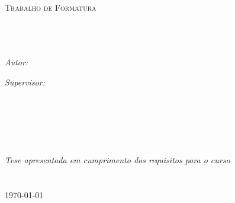 \documentclass[
11pt, %
brazilian, %
singlespacing, %
]{MastersDoctoralThesis} %
\author{Antonio R. de Campos Junior} %
\begin{document}
\frontmatter %

\pagestyle{plain} %


\begin{titlepage}
\begin{center}

\textsc{\LARGE \univname}\\[1.5cm] %
\textsc{\Large Trabalho de Formatura}\\[0.5cm] %

\HRule \\[0.4cm] %
{\huge \bfseries \ttitle}\\[0.4cm] %
\HRule \\[1.5cm] %
 
\begin{minipage}{0.4\textwidth}
\begin{flushleft} \large
\emph{Autor:}\\
\href{http://www.ime.usp.br/~arcjr}{\authorname} %
\end{flushleft}
\end{minipage}
\begin{minipage}{0.4\textwidth}
\begin{flushright} \large
\emph{Supervisor:} \\
\href{http://www.ime.usp.br/~cef/}{\supname} %
\end{flushright}
\end{minipage}\\[3cm]
\leavevmode \\
\leavevmode \\
\leavevmode \\
\leavevmode \\

\large \textit{Tese apresentada em cumprimento dos requisitos para o curso \\ \degreename}\\[0.3cm] %
\deptname\\[2cm] %
 
{\large \today}\\[4cm] %
 
\vfill
\end{center}
\end{titlepage}
\end{document}
